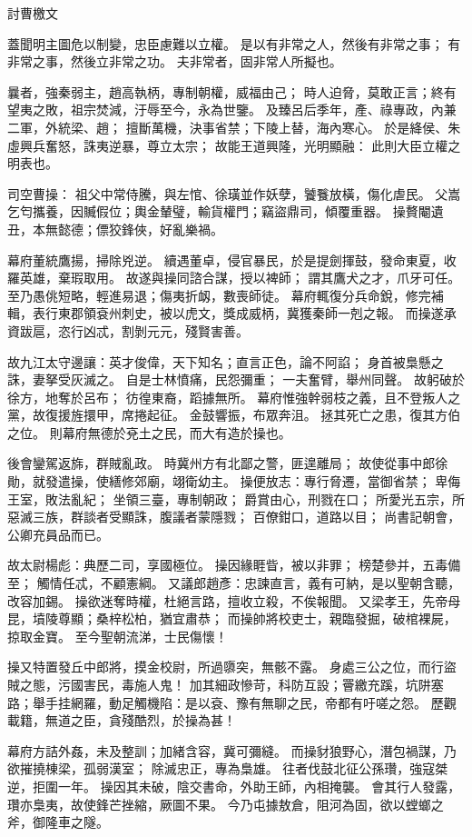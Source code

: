 討曹檄文

蓋聞明主圖危以制變，忠臣慮難以立權。
是以有非常之人，然後有非常之事；
有非常之事，然後立非常之功。
夫非常者，固非常人所擬也。

曩者，強秦弱主，趙高執柄，專制朝權，威福由己；
時人迫脅，莫敢正言；終有望夷之敗，祖宗焚減，汙辱至今，永為世鑒。
及臻呂后季年，產、祿專政，內兼二軍，外統梁、趙；
擅斷萬機，決事省禁；下陵上替，海內寒心。
於是絳侯、朱虛興兵奮怒，誅夷逆暴，尊立太宗；
故能王道興隆，光明顯融：
此則大臣立權之明表也。

司空曹操：
祖父中常侍騰，與左悺、徐璜並作妖孽，饕餮放橫，傷化虐民。
父嵩乞匄攜養，因贓假位；輿金輦璧，輸貨權門；竊盜鼎司，傾覆重器。
操贅閹遺丑，本無懿德；僄狡鋒俠，好亂樂禍。

幕府董統鷹揚，掃除兇逆。
續遇董卓，侵官暴民，於是提劍揮鼓，發命東夏，收羅英雄，棄瑕取用。
故遂與操同諮合謀，授以裨師；
謂其鷹犬之才，爪牙可任。
至乃愚佻短略，輕進易退；傷夷折衂，數喪師徒。
幕府輒復分兵命銳，修完補輯，表行東郡領袞州刺史，被以虎文，獎成威柄，冀獲秦師一剋之報。
而操遂承資跋扈，恣行凶忒，割剝元元，殘賢害善。

故九江太守邊讓：英才俊偉，天下知名；直言正色，論不阿諂；
身首被梟懸之誅，妻拏受灰滅之。
自是士林憤痛，民怨彌重；
一夫奮臂，舉州同聲。
故躬破於徐方，地奪於呂布；
彷徨東裔，蹈據無所。
幕府惟強幹弱枝之義，且不登叛人之黨，故復援旌擐甲，席捲起征。
金鼓響振，布眾奔沮。
拯其死亡之患，復其方伯之位。
則幕府無德於兗土之民，而大有造於操也。

後會鑾駕返旆，群賊亂政。
時冀州方有北鄙之警，匪遑離局；
故使從事中郎徐勛，就發遣操，使繕修郊廟，翊衛幼主。
操便放志：專行脅遷，當御省禁；
卑侮王室，敗法亂紀；
坐領三臺，專制朝政；
爵賞由心，刑戮在口；
所愛光五宗，所惡滅三族，群談者受顯誅，腹議者蒙隱戮；
百僚鉗口，道路以目；
尚書記朝會，公卿充員品而已。

故太尉楊彪：典歷二司，享國極位。
操因緣睚眥，被以非罪；
榜楚參并，五毒備至；
觸情任忒，不顧憲綱。
又議郎趙彥：忠諫直言，義有可納，是以聖朝含聽，改容加錫。
操欲迷奪時權，杜絕言路，擅收立殺，不俟報聞。
又梁孝王，先帝母昆，墳陵尊顯；桑梓松柏，猶宜肅恭；
而操帥將校吏士，親臨發掘，破棺裸屍，掠取金寶。
至今聖朝流涕，士民傷懷！

操又特置發丘中郎將，摸金校尉，所過隳突，無骸不露。
身處三公之位，而行盜賊之態，污國害民，毒施人鬼！
加其細政慘苛，科防互設；罾繳充蹊，坑阱塞路；舉手挂網羅，動足觸機陷：是以袞、豫有無聊之民，帝都有吁嗟之怨。
歷觀載籍，無道之臣，貪殘酷烈，於操為甚！

幕府方詰外姦，未及整訓；加緒含容，冀可彌縫。
而操豺狼野心，潛包禍謀，乃欲摧撓棟梁，孤弱漢室；
除滅忠正，專為梟雄。
往者伐鼓北征公孫瓚，強寇桀逆，拒圍一年。
操因其未破，陰交書命，外助王師，內相掩襲。
會其行人發露，瓚亦梟夷，故使鋒芒挫縮，厥圖不果。
今乃屯據敖倉，阻河為固，欲以螳螂之斧，御隆車之隧。

